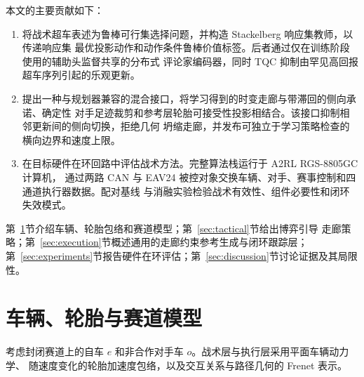 \documentclass[final,5p,twocolumn]{elsarticle}
\begin{document}
本文的主要贡献如下：
\begin{enumerate}
    \item 将战术超车表述为鲁棒可行集选择问题，并构造 Stackelberg 响应集教师，以传递响应集
    最优投影动作和动作条件鲁棒价值标签。后者通过仅在训练阶段使用的辅助头监督共享的分布式
    评论家编码器，同时 TQC 抑制由罕见高回报超车序列引起的乐观更新。

    \item 提出一种与规划器兼容的混合接口，将学习得到的时变走廊与带滞回的侧向承诺、确定性
    对手足迹裁剪和参考层轮胎可接受性投影相结合。该接口抑制相邻更新间的侧向切换，拒绝几何
    坍缩走廊，并发布可独立于学习策略检查的横向边界和速度上限。

    \item 在目标硬件在环回路中评估战术方法。完整算法栈运行于 A2RL RGS-8805GC 计算机，
    通过两路 CAN 与 EAV24 被控对象交换车辆、对手、赛事控制和四通道执行器数据。配对基线
    与消融实验检验战术有效性、组件必要性和闭环失效模式。
\end{enumerate}

第~\ref{sec:model}节介绍车辆、轮胎包络和赛道模型；第~\ref{sec:tactical}节给出博弈引导
走廊策略；第~\ref{sec:execution}节概述通用的走廊约束参考生成与闭环跟踪层；
第~\ref{sec:experiments}节报告硬件在环评估；第~\ref{sec:discussion}节讨论证据及其局限性。

\begingroup
\setlength{\abovedisplayskip}{6pt plus 1pt minus 1pt}
\setlength{\belowdisplayskip}{6pt plus 1pt minus 1pt}
\setlength{\abovedisplayshortskip}{4pt plus 1pt minus 1pt}
\setlength{\belowdisplayshortskip}{4pt plus 1pt minus 1pt}
\setlength{\jot}{2pt}
\section{车辆、轮胎与赛道模型}\label{sec:model}
考虑封闭赛道上的自车 $e$ 和非合作对手车 $o$。战术层与执行层采用平面车辆动力学、
随速度变化的轮胎加速度包络，以及交互关系与路径几何的 Frenet 表示。
\end{document}
